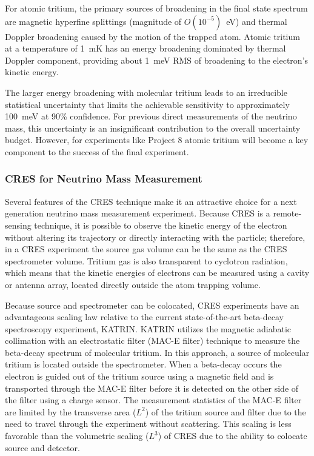 For atomic tritium, the primary sources of broadening in the final state spectrum are magnetic hyperfine splittings (magnitude of $O(10^{-5})$~eV) and thermal Doppler broadening caused by the motion of the trapped atom. Atomic tritium at a temperature of 1~mK has an energy broadening dominated by thermal Doppler component, providing about 1~meV RMS of broadening to the electron's kinetic energy.

The larger energy broadening with molecular tritium leads to an irreducible statistical uncertainty that limits the achievable sensitivity to approximately 100~meV at 90\% confidence. For previous direct measurements of the neutrino mass, this uncertainty is an insignificant contribution to the overall uncertainty budget. However, for experiments like Project 8 atomic tritium will become a key component to the success of the final experiment.

\subsubsection*{CRES for Neutrino Mass Measurement}

Several features of the CRES technique make it an attractive choice for a next generation neutrino mass measurement experiment. Because CRES is a remote-sensing technique, it is possible to observe the kinetic energy of the electron without altering its trajectory or directly interacting with the particle; therefore, in a CRES experiment the source gas volume can be the same as the CRES spectrometer volume. Tritium gas is also transparent to cyclotron radiation, which means that the kinetic energies of electrons can be measured using a cavity or antenna array, located directly outside the atom trapping volume. 

Because source and spectrometer can be colocated, CRES experiments have an advantageous scaling law relative to the current state-of-the-art beta-decay spectroscopy experiment, KATRIN. KATRIN utilizes the magnetic adiabatic collimation with an electrostatic filter (MAC-E filter) technique to measure the beta-decay spectrum of molecular tritium. In this approach, a source of molecular tritium is located outside the spectrometer. When a beta-decay occurs the electron is guided out of the tritium source using a magnetic field and is transported through the MAC-E filter before it is detected on the other side of the filter using a charge sensor. The measurement statistics of the MAC-E filter are limited by the transverse area ($L^2$) of the tritium source and filter due to the need to travel through the experiment without scattering. This scaling is less favorable than the volumetric scaling ($L^3$) of CRES due to the ability to colocate source and detector.

